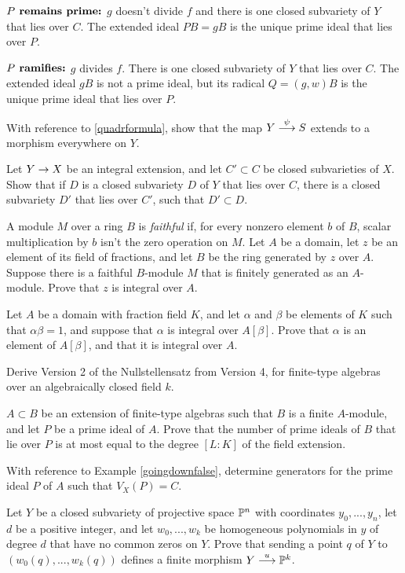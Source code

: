 \documentclass[leqno]{book}
\theoremstyle{definition}%
\numberwithin{equation}{section}
\theoremstyle{theorem} %
\begin{document}
\no $\text{\bf{$P$ remains prime:}}$ $g$ doesn't divide $f$ and there 
is one closed subvariety of $Y$ that lies over $C$.  The extended
ideal $PB=gB$ is the unique prime ideal that lies over $P$.

\no
 $\text{\bf{$P$ ramifies:}}$ $g$ divides $f$.  
There is one closed subvariety of
$Y$ that lies over $C$.  The extended ideal $gB$ is not a prime ideal,
but its radical $Q = (g,w)B$ is the unique prime ideal that lies over
$P$.

 
\bs With reference to \ref{quadrformula}, show that the map $Y
\stackrel \psi {\longrightarrow} S$ extends to a morphism everywhere on  $Y$.

\bs Let $Y\rightarrow X$ be an integral extension, and let $C'\subset C$ be
closed subvarieties of $X$.  Show that if $D$ is a closed subvariety $D$ of
$Y$ that lies over $C$, there is a closed subvariety $D'$ that lies
over $C'$, such that $D'\subset D$.


\bs
  A module $M$ over
a ring $B$ is {\it faithful} if, for every nonzero element $b$ of $B$,
scalar multiplication by $b$ isn't the zero operation on $M$.  Let $A$
be a domain, let $z$ be an element of its field of fractions, and let
$B$ be the ring generated by $z$ over $A$.  Suppose there is a
faithful $B$-module $M$ that is finitely generated as an $A$-module.
Prove that $z$ is integral over $A$.


\bs
  Let $A$ be a domain with fraction field $K$, and let $\alpha$ and
  $\beta$ be elements of $K$ such that $\alpha\beta = 1$, and suppose that
  $\alpha$ is integral over $A[\beta]$.  Prove that $\alpha$ is an
  element of $A[\beta]$, and that it is integral over $A$.


\bs
Derive Version 2 of the Nullstellensatz from Version 4, for
finite-type algebras over an algebraically closed field $k$.


\bs
  $A\subset B$ be an extension of finite-type algebras such that $B$
  is a finite $A$-module, and let $P$ be a prime ideal of $A$.  Prove
  that the number of prime ideals of $B$ that lie over $P$ is at most
  equal to the degree $[L:K]$ of the field extension.

\bs
  With reference to Example
\ref{goingdownfalse}, determine generators for the prime ideal $P$ of
$A$ such that $V_X(P) = C$.

\bs
 Let $Y$ be a closed
subvariety of projective space $\mathbb{P}^n$ with coordinates
$y_0,...,y_n$, let $d$ be a positive integer, and let $w_0,...,w_k$ be
homogeneous polynomials in $y$ of degree $d$ that have no
common zeros on $Y$.  Prove that sending a point $q$ of $Y$ to
$(w_0(q),...,w_k(q))$ defines a finite morphism $Y \stackrel u
\longrightarrow\mathbb{P}^k$.
\end{document}
